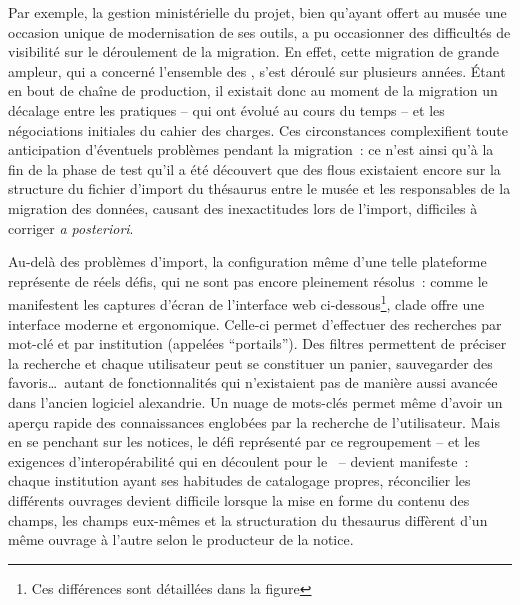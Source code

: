 Par exemple, la gestion ministérielle du projet, bien qu'ayant offert au musée une occasion unique de modernisation de ses outils, a pu occasionner des difficultés de visibilité sur le déroulement de la migration. En effet, cette migration de grande ampleur, qui a concerné l'ensemble des \bibmusee, s'est déroulé sur plusieurs années. Étant en bout de chaîne de production, il existait donc au moment de la migration un décalage entre les pratiques -- qui ont évolué au cours du temps -- et les négociations initiales du cahier des charges. Ces circonstances complexifient toute anticipation d'éventuels problèmes pendant la migration~: ce n'est ainsi qu'à la fin de la phase de test qu'il a été découvert que des flous existaient encore sur la structure du fichier d'import du thésaurus entre le musée et les responsables de la migration des données, causant des inexactitudes lors de l'import, difficiles à corriger \textit{a posteriori}.

Au-delà des problèmes d'import, la configuration même d'une telle plateforme représente de réels défis, qui ne sont pas encore pleinement résolus~: comme le manifestent les captures d'écran de l'interface web ci-dessous\footnote{Ces différences sont détaillées dans la figure }, \gls{clade} offre une interface moderne et ergonomique. Celle-ci permet d'effectuer des recherches par mot-clé et par institution (appelées \enquote{portails}). Des filtres permettent de préciser la recherche et chaque utilisateur peut se constituer un panier, sauvegarder des favoris\dots~autant de fonctionnalités qui n'existaient pas de manière aussi avancée dans l'ancien logiciel \gls{alexandrie}. Un nuage de mots-clés permet même d'avoir un aperçu rapide des connaissances englobées par la recherche de l'utilisateur. Mais en se penchant sur les notices, le défi représenté par ce regroupement -- et les exigences d'interopérabilité qui en découlent pour le \mae~-- devient manifeste~: chaque institution ayant ses habitudes de catalogage propres, réconcilier les différents ouvrages devient difficile lorsque la mise en forme du contenu des champs, les champs eux-mêmes et la structuration du \gls{thesaurus} diffèrent d'un même ouvrage à l'autre selon le producteur de la notice.


